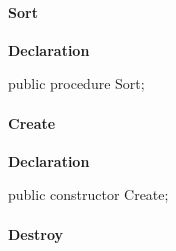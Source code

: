 \documentclass{report}
\newif\ifpdf
\begin{document}
\paragraph*{Sort}\hspace*{\fill}

\label{PasDoc_HierarchyTree.TStringCardinalTree-Sort}
\begin{list}{}{
\setlength{\itemindent}{0cm}
\setlength{\listparindent}{0cm}
\setlength{\leftmargin}{\evensidemargin}
\addtolength{\leftmargin}{\tmplength}
\settowidth{\labelsep}{X}
\addtolength{\leftmargin}{\labelsep}
\setlength{\labelwidth}{\tmplength}
}
\item[\textbf{Declaration}\hfill]
\ifpdf
\begin{flushleft}
\fi
\begin{ttfamily}
public procedure Sort;\end{ttfamily}

\ifpdf
\end{flushleft}
\fi

\end{list}
\paragraph*{Create}\hspace*{\fill}

\label{PasDoc_HierarchyTree.TStringCardinalTree-Create}
\begin{list}{}{
\setlength{\itemindent}{0cm}
\setlength{\listparindent}{0cm}
\setlength{\leftmargin}{\evensidemargin}
\addtolength{\leftmargin}{\tmplength}
\settowidth{\labelsep}{X}
\addtolength{\leftmargin}{\labelsep}
\setlength{\labelwidth}{\tmplength}
}
\item[\textbf{Declaration}\hfill]
\ifpdf
\begin{flushleft}
\fi
\begin{ttfamily}
public constructor Create;\end{ttfamily}

\ifpdf
\end{flushleft}
\fi

\end{list}
\paragraph*{Destroy}\hspace*{\fill}
\end{document}
